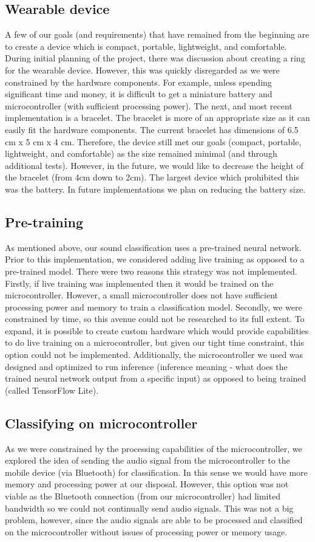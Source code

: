 \documentclass{article}
\begin{document}
\subsection{Wearable device}
A few of our goals (and requirements) that have remained from the beginning are to create a device which is compact, portable, lightweight, and comfortable. During initial planning of the project, there was discussion about creating a ring for the wearable device. However, this was quickly disregarded as we were constrained by the hardware components. For example, unless spending significant time and money, it is difficult to get a miniature battery and microcontroller (with sufficient processing power). The next, and most recent implementation is a bracelet. The bracelet is more of an appropriate size as it can easily fit the hardware components. The current bracelet has dimensions of 6.5 cm x 5 cm x 4 cm. Therefore, the device still met our goals (compact, portable, lightweight, and comfortable) as the size remained minimal (and through additional tests). However, in the future, we would like to decrease the height of the bracelet (from 4cm down to 2cm). The largest device which prohibited this was the battery. In future implementations we plan on reducing the battery size.
\subsection{Pre-training}
As mentioned above, our sound classification uses a pre-trained neural network. Prior to this implementation, we considered adding live training as opposed to a pre-trained model. There were two reasons this strategy was not implemented. Firstly, if live training was implemented then it would be trained on the microcontroller. However, a small microcontroller does not have sufficient processing power and memory to train a classification model. Secondly, we were constrained by time, so this avenue could not be researched to its full extent. To expand, it is possible to create custom hardware which would provide capabilities to do live training on a microcontroller, but given our tight time constraint, this option could not be implemented. Additionally, the microcontroller we used was designed and optimized to run inference (inference meaning -  what does the trained neural network output from a specific input) as opposed to being trained (called TensorFlow Lite). 
\subsection{Classifying on microcontroller}
As we were constrained by the processing capabilities of the microcontroller, we explored the idea of sending the audio signal from the microcontroller to the mobile device (via Bluetooth) for classification. In this sense we would have more memory and processing power at our disposal. However, this option was not viable as the Bluetooth connection (from our microcontroller) had limited bandwidth so we could not continually send audio signals. This was not a big problem, however, since the audio signals are able to be processed and classified on the microcontroller without issues of processing power or memory usage. 
\end{document}
